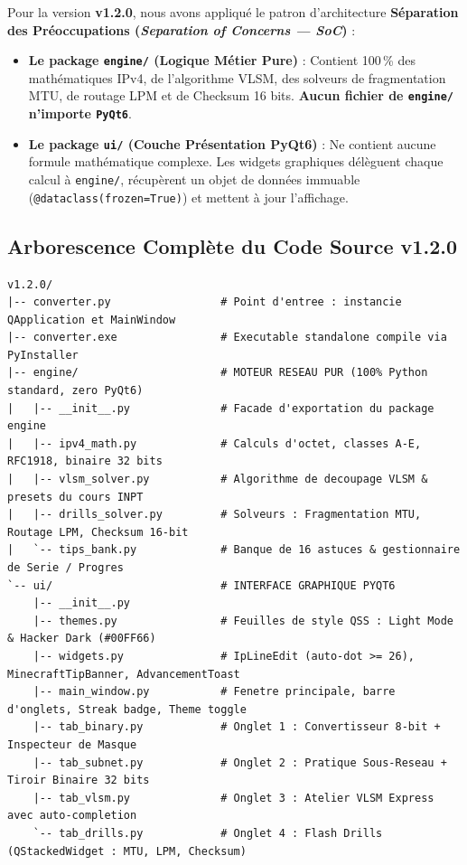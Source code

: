 \documentclass[11pt,a4paper]{article}
\begin{document}
Pour la version \textbf{v1.2.0}, nous avons appliqué le patron d'architecture \textbf{Séparation des Préoccupations (\textit{Separation of Concerns — SoC})} :
\begin{itemize}
    \item \textbf{Le package \texttt{engine/} (Logique Métier Pure)} :
    Contient 100\,\% des mathématiques IPv4, de l'algorithme VLSM, des solveurs de fragmentation MTU, de routage LPM et de Checksum 16 bits. \textbf{Aucun fichier de \texttt{engine/} n'importe \texttt{PyQt6}}.
    \item \textbf{Le package \texttt{ui/} (Couche Présentation PyQt6)} :
    Ne contient aucune formule mathématique complexe. Les widgets graphiques délèguent chaque calcul à \texttt{engine/}, récupèrent un objet de données immuable (\texttt{@dataclass(frozen=True)}) et mettent à jour l'affichage.
\end{itemize}

\subsection{Arborescence Complète du Code Source v1.2.0}
\begin{lstlisting}
v1.2.0/
|-- converter.py                 # Point d'entree : instancie QApplication et MainWindow
|-- converter.exe                # Executable standalone compile via PyInstaller
|-- engine/                      # MOTEUR RESEAU PUR (100% Python standard, zero PyQt6)
|   |-- __init__.py              # Facade d'exportation du package engine
|   |-- ipv4_math.py             # Calculs d'octet, classes A-E, RFC1918, binaire 32 bits
|   |-- vlsm_solver.py           # Algorithme de decoupage VLSM & presets du cours INPT
|   |-- drills_solver.py         # Solveurs : Fragmentation MTU, Routage LPM, Checksum 16-bit
|   `-- tips_bank.py             # Banque de 16 astuces & gestionnaire de Serie / Progres
`-- ui/                          # INTERFACE GRAPHIQUE PYQT6
    |-- __init__.py
    |-- themes.py                # Feuilles de style QSS : Light Mode & Hacker Dark (#00FF66)
    |-- widgets.py               # IpLineEdit (auto-dot >= 26), MinecraftTipBanner, AdvancementToast
    |-- main_window.py           # Fenetre principale, barre d'onglets, Streak badge, Theme toggle
    |-- tab_binary.py            # Onglet 1 : Convertisseur 8-bit + Inspecteur de Masque
    |-- tab_subnet.py            # Onglet 2 : Pratique Sous-Reseau + Tiroir Binaire 32 bits
    |-- tab_vlsm.py              # Onglet 3 : Atelier VLSM Express avec auto-completion
    `-- tab_drills.py            # Onglet 4 : Flash Drills (QStackedWidget : MTU, LPM, Checksum)
\end{lstlisting}
\end{document}
